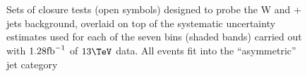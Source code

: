 \begin{figure}[h!]
  \begin{center}
     ~~
     \\
     ~~
     \\
    \caption{Sets of closure tests (open symbols) designed to probe
      the W and \ttbar + jets background, overlaid on top of
      the systematic uncertainty estimates used for each of the seven
      \scalht bins (shaded bands) carried out with $1.28\text{fb}^{-1}$ of
      $13\tev$ data. All events fit into the ``asymmetric'' jet
      category}
    \label{fig:ttWclosureDataAsym}
  \end{center} 
\end{figure}

